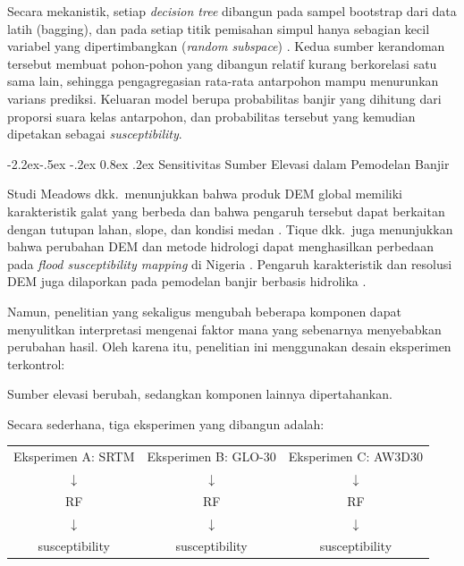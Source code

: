 \documentclass[12pt,a4paper]{article}
\makeatletter
\renewcommand\subsection{\@startsection{subsection}{2}{\z@}%
  {-2.2ex\@plus -.5ex \@minus -.2ex}%
  {0.8ex \@plus .2ex}%
  {\normalfont\normalsize\bfseries}}
\makeatother
\begin{document}
Secara mekanistik, setiap \textit{decision tree} dibangun pada sampel
bootstrap dari data latih (bagging), dan pada setiap titik pemisahan
simpul hanya sebagian kecil variabel yang dipertimbangkan (\textit{random
subspace}) \citep{breiman2001}. Kedua sumber kerandoman tersebut membuat
pohon-pohon yang dibangun relatif kurang berkorelasi satu sama lain, sehingga
pengagregasian rata-rata antarpohon mampu menurunkan varians prediksi.
Keluaran model berupa probabilitas banjir yang dihitung dari proporsi
suara kelas antarpohon, dan probabilitas tersebut yang kemudian dipetakan
sebagai \textit{susceptibility}.

\subsection{Sensitivitas Sumber Elevasi dalam Pemodelan Banjir}

Studi Meadows dkk.\ menunjukkan bahwa produk DEM global memiliki
karakteristik galat yang berbeda dan bahwa pengaruh tersebut dapat berkaitan
dengan tutupan lahan, slope, dan kondisi medan \citep{meadows2024}. Tique
dkk.\ juga menunjukkan bahwa perubahan DEM dan metode hidrologi dapat
menghasilkan perbedaan pada \textit{flood susceptibility mapping} di Nigeria
\citep{Tique2026}. Pengaruh karakteristik dan resolusi DEM juga dilaporkan pada pemodelan banjir
berbasis hidrolika \citep{fatdillah2022,fikri2026}.

Namun, penelitian yang sekaligus mengubah beberapa komponen dapat
menyulitkan interpretasi mengenai faktor mana yang sebenarnya menyebabkan
perubahan hasil. Oleh karena itu, penelitian ini menggunakan desain
eksperimen terkontrol:

\begin{center}
Sumber elevasi berubah, sedangkan komponen lainnya dipertahankan.
\end{center}

Secara sederhana, tiga eksperimen yang dibangun adalah:

\begin{center}
\begin{tabular}{ccc}
Eksperimen A: SRTM & Eksperimen B: GLO-30 & Eksperimen C: AW3D30 \\
$\downarrow$ & $\downarrow$ & $\downarrow$ \\
RF & RF & RF \\
$\downarrow$ & $\downarrow$ & $\downarrow$ \\
susceptibility & susceptibility & susceptibility \\
\end{tabular}
\end{center}
\end{document}
